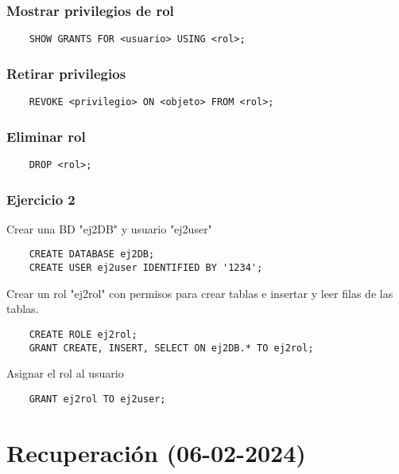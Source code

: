 \documentclass{article}
\begin{document}
\subsubsection{Mostrar privilegios de rol}
\begin{verbatim}
	SHOW GRANTS FOR <usuario> USING <rol>;
\end{verbatim}
\subsubsection{Retirar privilegios}
\begin{verbatim}
	REVOKE <privilegio> ON <objeto> FROM <rol>;
\end{verbatim}
\subsubsection{Eliminar rol}
\begin{verbatim}
	DROP <rol>;
\end{verbatim}
\subsubsection{Ejercicio 2}
Crear una BD "ej2DB" y usuario "ej2user"
\begin{verbatim}
	CREATE DATABASE ej2DB;
	CREATE USER ej2user IDENTIFIED BY '1234';
\end{verbatim}
Crear un rol "ej2rol" con permisos para crear tablas e insertar y leer filas de las tablas.
\begin{verbatim}
	CREATE ROLE ej2rol;
	GRANT CREATE, INSERT, SELECT ON ej2DB.* TO ej2rol;
\end{verbatim}
Asignar el rol al usuario
\begin{verbatim}
	GRANT ej2rol TO ej2user;
\end{verbatim}


\section{Recuperación (06-02-2024)}
\end{document}
